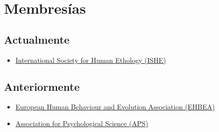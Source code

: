 \documentclass[11pt, a4paper]{awesome-cv}
\providecommand{\tightlist}{%
	\setlength{\itemsep}{0pt}\setlength{\parskip}{0pt}}
\begin{document}
\begin{cventries}
\end{cventries}

\hypertarget{membresuxedas}{%
\section{Membresías}\label{membresuxedas}}

\hypertarget{actualmente}{%
\subsection{Actualmente}\label{actualmente}}

\begin{itemize}
\tightlist
\item
  \href{https://ishe.org/}{International Society for Human Ethology
  (ISHE)}
\end{itemize}

\hypertarget{anteriormente}{%
\subsection{Anteriormente}\label{anteriormente}}

\begin{itemize}
\tightlist
\item
  \href{https://www.cambridge.org/core/membership/ehbea}{European Human
  Behaviour and Evolution Association (EHBEA)}
\item
  \href{https://www.psychologicalscience.org/}{Association for
  Psychological Science (APS)}
\end{itemize}
\end{document}
